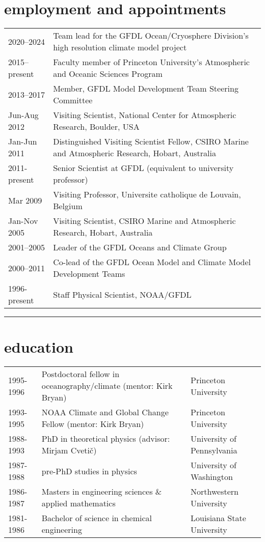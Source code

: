 \documentclass{article}
\begin{document}
\section*{\sc \color{Maroon}  employment and appointments} 
\vspace{-.25cm}
\begin{tabular}{ll}

2020--2024 & Team lead for the GFDL Ocean/Cryosphere Division's high resolution climate model project
  \\
  2015--present & Faculty member of Princeton University's Atmospheric and Oceanic Sciences Program
  \\
  2013--2017  & Member, GFDL Model Development Team Steering Committee  \\
  
  Jun-Aug 2012  & Visiting Scientist, National Center for Atmospheric
                  Research, Boulder, USA \\
  Jan-Jun 2011   & Distinguished Visiting Scientist Fellow, CSIRO Marine and Atmospheric Research, Hobart, Australia \\
  2011-present & Senior Scientist at GFDL (equivalent to university professor) \\ 
  Mar 2009         & Visiting Professor, Universite catholique de Louvain, Belgium \\
  Jan-Nov 2005   & Visiting Scientist, CSIRO Marine and Atmospheric  Research, Hobart, Australia \\
  2001--2005     & Leader of the GFDL Oceans and Climate Group \\
  2000--2011     & Co-lead of the GFDL Ocean Model and Climate Model Development Teams \\
  1996-present   &  Staff Physical Scientist, NOAA/GFDL \\  
\end{tabular}

\noindent\rule{\textwidth}{1pt}
\vspace{-1cm}
\section*{\sc \color{Maroon} education}
\vspace{-.25cm}
\begin{tabular}{lll}
1995-1996  &  Postdoctoral fellow in oceanography/climate (mentor: Kirk Bryan) & Princeton University 
\\
1993-1995  &  NOAA Climate and Global Change Fellow (mentor: Kirk Bryan) & Princeton University 
\\
1988-1993  &  PhD in theoretical physics 
(advisor: Mirjam Cveti\v{c}) 
& University of Pennsylvania 
\\
1987-1988  &  pre-PhD studies in physics & University of Washington
\\
1986-1987  &  Masters in engineering sciences \& applied mathematics   & Northwestern University\\
1981-1986  &  Bachelor of science in chemical engineering  & Louisiana State University \\
 \end{tabular}
\end{document}

